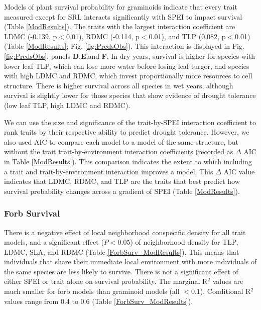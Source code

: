 \documentclass[12pt, letterpaper]{article}
\begin{document}
Models of plant survival probability for graminoids indicate that every trait measured except for SRL interacts significantly with SPEI to impact survival (Table \ref{ModResults}). The traits with the largest interaction coefficient are LDMC (-0.139, p$<$0.01), RDMC (-0.114, p$<$0.01), and TLP (0.082, p$<$0.01)(Table \ref{ModResults}; Fig. \ref{fig:PredsObs}). This interaction is displayed in Fig.\ref{fig:PredsObs}, panels \textbf{D},\textbf{E},and \textbf{F}. In dry years, survival is higher for species with lower leaf TLP, which can lose more water before losing leaf turgor, and species with high LDMC and RDMC, which invest proportionally more resources to cell structure. There is higher survival across all species in wet years, although survival is slightly lower for those species that show evidence of drought tolerance (low leaf TLP, high LDMC and RDMC). 

We can use the size and significance of the trait-by-SPEI interaction coefficient to rank traits by their respective ability to predict drought tolerance. However, we also used AIC to compare each model to a model of the same structure, but without the trait  trait-by-environment interaction coefficients (recorded as $\Delta$ AIC in Table \ref{ModResults}). This comparison indicates the extent to which including a trait and trait-by-environment interaction improves a model. This $\Delta$ AIC value indicates that LDMC, RDMC, and TLP are the traits that best predict how survival probability changes across a gradient of SPEI (Table \ref{ModResults}). 

\subsubsection{Forb Survival}
There is a negative effect of local neighborhood conspecific density for all trait models, and a significant effect ($P<0.05$) of neighborhood density for TLP, LDMC, SLA, and RDMC (Table \ref{ForbSurv_ModResults}). This means that individuals that share their immediate local environment with more individuals of the same species are less likely to survive. There is not a significant effect of either SPEI or trait alone on survival probability. The marginal R$^2$ values are much smaller for
forb models than graminoid models (all $<0.1$). Conditional R$^2$ values range from 0.4 to 0.6 (Table \ref{ForbSurv_ModResults}).
\end{document}
